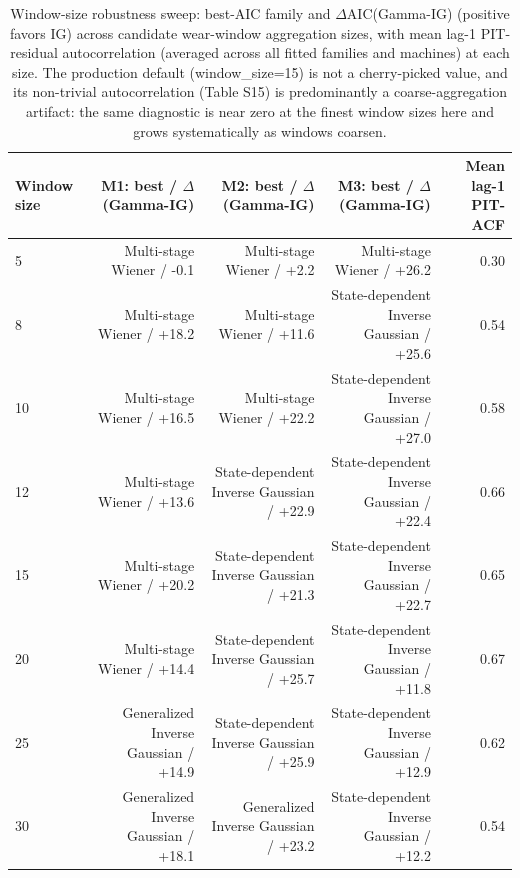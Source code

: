 \begin{table}[t]
\centering
\caption{Window-size robustness sweep: best-AIC family and $\Delta$AIC(Gamma-IG) (positive favors IG) across candidate wear-window aggregation sizes, with mean lag-1 PIT-residual autocorrelation (averaged across all fitted families and machines) at each size. The production default (window\_size=15) is not a cherry-picked value, and its non-trivial autocorrelation (Table S15) is predominantly a coarse-aggregation artifact: the same diagnostic is near zero at the finest window sizes here and grows systematically as windows coarsen.}
\label{tab:window-size-sweep}
\begin{tabular}{lrrrr}
\toprule
Window size & M1: best / $\Delta$(Gamma-IG) & M2: best / $\Delta$(Gamma-IG) & M3: best / $\Delta$(Gamma-IG) & Mean lag-1 PIT-ACF \\
\midrule
5 & Multi-stage Wiener / -0.1 & Multi-stage Wiener / +2.2 & Multi-stage Wiener / +26.2 & 0.30 \\
8 & Multi-stage Wiener / +18.2 & Multi-stage Wiener / +11.6 & State-dependent Inverse Gaussian / +25.6 & 0.54 \\
10 & Multi-stage Wiener / +16.5 & Multi-stage Wiener / +22.2 & State-dependent Inverse Gaussian / +27.0 & 0.58 \\
12 & Multi-stage Wiener / +13.6 & State-dependent Inverse Gaussian / +22.9 & State-dependent Inverse Gaussian / +22.4 & 0.66 \\
15 & Multi-stage Wiener / +20.2 & State-dependent Inverse Gaussian / +21.3 & State-dependent Inverse Gaussian / +22.7 & 0.65 \\
20 & Multi-stage Wiener / +14.4 & State-dependent Inverse Gaussian / +25.7 & State-dependent Inverse Gaussian / +11.8 & 0.67 \\
25 & Generalized Inverse Gaussian / +14.9 & State-dependent Inverse Gaussian / +25.9 & State-dependent Inverse Gaussian / +12.9 & 0.62 \\
30 & Generalized Inverse Gaussian / +18.1 & Generalized Inverse Gaussian / +23.2 & State-dependent Inverse Gaussian / +12.2 & 0.54 \\
\bottomrule
\end{tabular}
\end{table}
